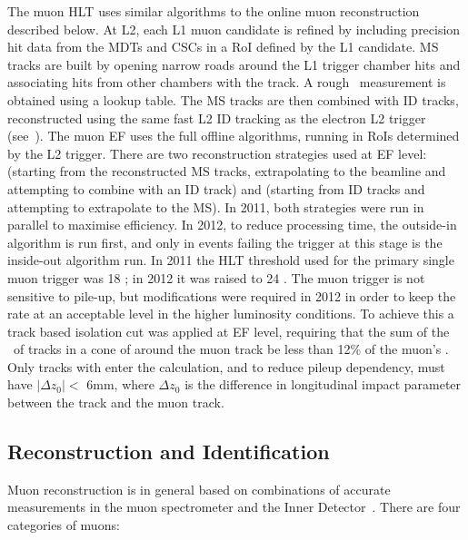 The muon HLT uses similar algorithms to the online muon reconstruction described
below. At L2, each L1 muon candidate is refined by including precision hit data
from the MDTs and CSCs in a RoI defined by the L1 candidate. MS tracks are
built by opening narrow roads around the L1 trigger chamber hits and associating
hits from other chambers with the track. A rough \pt\ measurement is obtained
using a lookup table. The MS tracks are then combined with ID tracks,
reconstructed using the same fast L2 ID tracking as the electron L2 trigger
(see~). The muon EF uses the full offline algorithms,
running in RoIs determined by the L2 trigger. There are two reconstruction
strategies used at EF level:  (starting from the reconstructed
MS tracks, extrapolating to the beamline and attempting to combine with an ID
track) and  (starting from ID tracks and attempting to
extrapolate to the MS). In 2011, both strategies were run in parallel to
maximise efficiency. In 2012, to reduce processing time, the outside-in
algorithm is run first, and only in events failing the trigger at this stage is
the inside-out algorithm run. In 2011 the HLT threshold used for the primary
single muon trigger was 18 \GeV; in 2012 it was raised to 24 \GeV. The muon
trigger is not sensitive to pile-up, but modifications were required in 2012 in
order to keep the rate at an acceptable level in the higher luminosity
conditions. To achieve this a track based isolation cut was applied at EF level,
requiring that the sum of the \pt\ of tracks in a cone of  around
the muon track be less than 12\% of the muon's \pt. Only tracks with 
enter the calculation, and to reduce pileup dependency, must have $|\Delta
z_{0}| <$ 6mm, where $\Delta z_{0}$ is the difference in longitudinal impact
parameter between the track and the muon track.

\subsection{Reconstruction and Identification}
\label{sec:reco-mu-reco}

Muon reconstruction is in general based on combinations of accurate measurements
in the muon spectrometer and the Inner Detector~\cite{ATLAS-CONF-2010-064,ATLAS-CONF-2011-063}. There are four categories of
muons:

